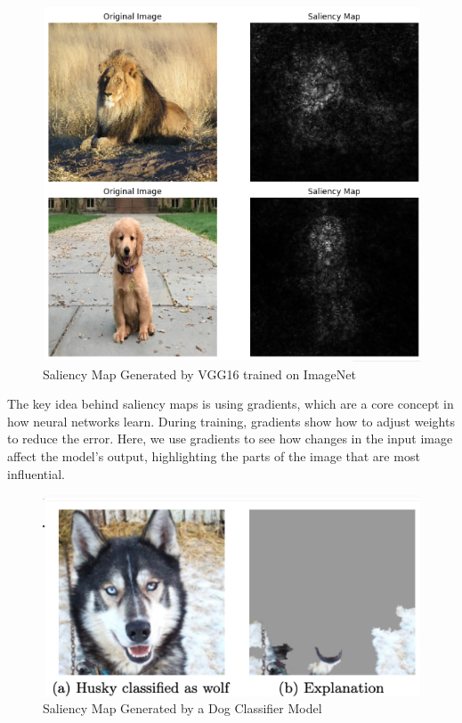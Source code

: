 \begin{figure}
    \centering
    \includegraphics[width=1\linewidth]{graphics//chapter7/smap vgg160.png}
    \caption{Saliency Map Generated by VGG16 trained on ImageNet }
    \label{fig:smap-0}
\end{figure}

The key idea behind saliency maps is using gradients, which are a core concept in how neural networks learn. During training, gradients show how to adjust weights to reduce the error. Here, we use gradients to see how changes in the input image affect the model's output, highlighting the parts of the image that are most influential.\cite{smap-paper}\cite{WEBSITE:smap-ref}
\par\vspace{1em}


\begin{figure}
    \centering
    \includegraphics[width=1\linewidth]{graphics//chapter7/smap dog breed.png}
    \caption{Saliency Map Generated by a Dog Classifier Model}
    \label{fig:smap-1}
\end{figure}

